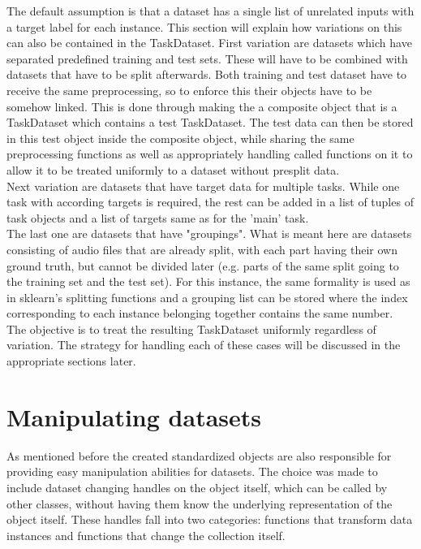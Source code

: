 The default assumption is that a dataset has a single list of unrelated inputs with a target label for each instance. This section will explain how variations on this can also be contained in the TaskDataset. First variation are datasets which have separated predefined training and test sets. These will have to be combined with datasets that have to be split afterwards. Both training and test dataset have to receive the same preprocessing, so to enforce this their objects have to be somehow linked. This is done through making the a composite object that is a TaskDataset which contains a test TaskDataset. The test data can then be stored in this test object inside the composite object, while sharing the same preprocessing functions as well as appropriately handling called functions on it to allow it to be treated uniformly to a dataset without presplit data. \\

Next variation are datasets that have target data for multiple tasks. While one task with according targets is required, the rest can be added in a list of tuples of task objects and a list of targets same as for the 'main' task. \\

The last one are datasets that have "groupings". What is meant here are datasets consisting of audio files that are already split, with each part having their own ground truth, but cannot be divided later (e.g. parts of the same split going to the training set and the test set). For this instance, the same formality is used as in sklearn's splitting functions and a grouping list can be stored where the index corresponding to each instance belonging together contains the same number. \\

The objective is to treat the resulting TaskDataset uniformly regardless of variation. The strategy for handling each of these cases will be discussed in the appropriate sections later.


\section{Manipulating datasets}

As mentioned before the created standardized objects are also responsible for providing easy manipulation abilities for datasets. The choice was made to include dataset changing handles on the object itself, which can be called by other classes, without having them know the underlying representation of the object itself. These handles fall into two categories: functions that transform data instances and functions that change the collection itself. \\

